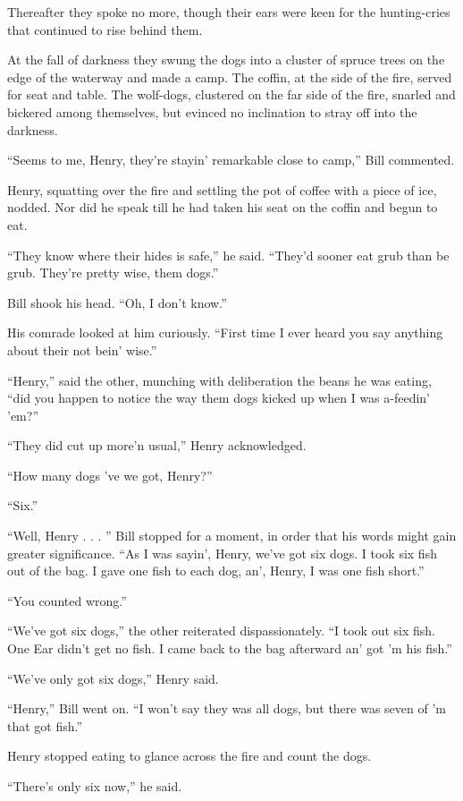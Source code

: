 \documentclass[10pt]{book}
\begin{document}
Thereafter they spoke no more, though their ears were keen for the
hunting-cries that continued to rise behind them.

At the fall of darkness they swung the dogs into a cluster of spruce
trees on the edge of the waterway and made a camp. The coffin, at the
side of the fire, served for seat and table. The wolf-dogs, clustered
on the far side of the fire, snarled and bickered among themselves, but
evinced no inclination to stray off into the darkness.

“Seems to me, Henry, they’re stayin’ remarkable close to camp,” Bill
commented.

Henry, squatting over the fire and settling the pot of coffee with a
piece of ice, nodded. Nor did he speak till he had taken his seat on
the coffin and begun to eat.

“They know where their hides is safe,” he said. “They’d sooner eat grub
than be grub. They’re pretty wise, them dogs.”

Bill shook his head. “Oh, I don’t know.”

His comrade looked at him curiously. “First time I ever heard you say
anything about their not bein’ wise.”

“Henry,” said the other, munching with deliberation the beans he was
eating, “did you happen to notice the way them dogs kicked up when I
was a-feedin’ ’em?”

“They did cut up more’n usual,” Henry acknowledged.

“How many dogs ’ve we got, Henry?”

“Six.”

“Well, Henry . . . ” Bill stopped for a moment, in order that his words
might gain greater significance. “As I was sayin’, Henry, we’ve got six
dogs. I took six fish out of the bag. I gave one fish to each dog, an’,
Henry, I was one fish short.”

“You counted wrong.”

“We’ve got six dogs,” the other reiterated dispassionately. “I took out
six fish. One Ear didn’t get no fish. I came back to the bag afterward
an’ got ’m his fish.”

“We’ve only got six dogs,” Henry said.

“Henry,” Bill went on. “I won’t say they was all dogs, but there was
seven of ’m that got fish.”

Henry stopped eating to glance across the fire and count the dogs.

“There’s only six now,” he said.
\end{document}
